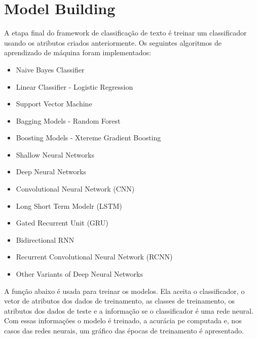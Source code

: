 \documentclass[11pt]{article}
\providecommand{\tightlist}{%
      \setlength{\itemsep}{0pt}\setlength{\parskip}{0pt}}
\begin{document}
    \hypertarget{model-building}{%
\section{\texorpdfstring{\textbf{Model
Building}}{Model Building}}\label{model-building}}

A etapa final do framework de classificação de texto é treinar um
classificador usando os atributos criados anteriormente. Os seguintes
algoritmos de aprendizado de máquina foram implementados:

\begin{itemize}
\tightlist
\item
  Naive Bayes Classifier
\item
  Linear Classifier - Logistic Regression
\item
  Support Vector Machine
\item
  Bagging Models - Random Forest
\item
  Boosting Models - Xtereme Gradient Boosting
\item
  Shallow Neural Networks
\item
  Deep Neural Networks
\item
  Convolutional Neural Network (CNN)
\item
  Long Short Term Modelr (LSTM)
\item
  Gated Recurrent Unit (GRU)
\item
  Bidirectional RNN
\item
  Recurrent Convolutional Neural Network (RCNN)
\item
  Other Variants of Deep Neural Networks
\end{itemize}

A função abaixo é usada para treinar os modelos. Ela aceita o
classificador, o vetor de atributos dos dados de treinamento, as classes
de treinamento, os atributos dos dados de teste e a informação se o
classificador é uma rede neural. Com essas informações o modelo é
treinado, a acurácia pe computada e, nos casos das redes neurais, um
gráfico das épocas de treinamento é apresentado.
\end{document}
